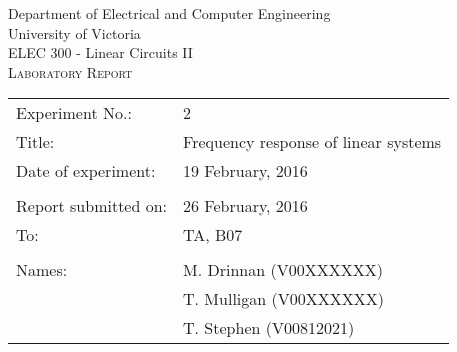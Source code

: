 \begin{center}
	\begin{LARGE}
		Department of Electrical and Computer Engineering \\
		University of Victoria \\
		ELEC 300 - Linear Circuits II \\[1cm]
		\textsc{Laboratory Report}
		\\[1cm]
	\end{LARGE}
\end{center}

\begin{tabular}{ p{} p{} }
	Experiment No.: & 2 \\ 
	Title: & Frequency response of linear systems \\ 
	Date of experiment:& 19 February, 2016 \\ 
	& \\
	Report submitted on:& 26 February, 2016 \\ 
	To: & TA, B07 \\ 
	& \\
	Names: & M. Drinnan (V00XXXXXX)\\
	& T. Mulligan (V00XXXXXX) \\
	& T. Stephen (V00812021)  
\end{tabular}

\newpage
